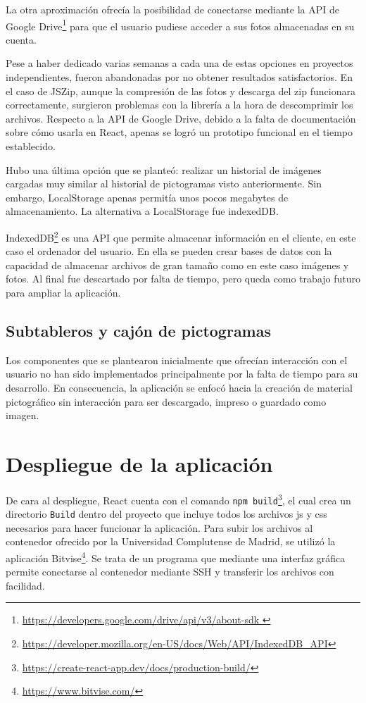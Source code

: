 La otra aproximación ofrecía la posibilidad de conectarse mediante la API de Google Drive\footnote{\url{https://developers.google.com/drive/api/v3/about-sdk }} para que el usuario pudiese acceder a sus fotos almacenadas en su cuenta. 

Pese a haber dedicado varias semanas a cada una de estas opciones en proyectos independientes, fueron abandonadas por no obtener resultados satisfactorios. En el caso de JSZip, aunque la compresión de las fotos y descarga del zip funcionara correctamente, surgieron problemas con la librería a la hora de descomprimir los archivos. Respecto a la API de Google Drive, debido a la falta de documentación sobre cómo usarla en React, apenas se logró un prototipo funcional en el tiempo establecido. 

Hubo una última opción que se planteó: realizar un historial de imágenes cargadas muy similar al historial de pictogramas visto anteriormente. Sin embargo, LocalStorage apenas permitía unos pocos megabytes de almacenamiento. La alternativa a LocalStorage fue indexedDB. 

IndexedDB\footnote{\url{https://developer.mozilla.org/en-US/docs/Web/API/IndexedDB_API}}   es una API que permite almacenar información en el cliente, en este caso el ordenador del usuario. En ella se pueden crear bases de datos con la capacidad de almacenar archivos de gran tamaño como en este caso imágenes y fotos. Al final fue descartado por falta de tiempo, pero queda como trabajo futuro para ampliar la aplicación.


\subsection{Subtableros y cajón de pictogramas}

Los componentes que se plantearon inicialmente que ofrecían interacción con el usuario no han sido implementados principalmente por la falta de tiempo para su desarrollo. En consecuencia, la aplicación se enfocó hacia la creación de material pictográfico sin interacción para ser descargado, impreso o guardado como imagen. 

\section{Despliegue de la aplicación}
\label{cap5:despliegue}

De cara al despliegue, React cuenta con el comando \texttt{npm build}\footnote{\url{https://create-react-app.dev/docs/production-build/}}, el cual crea un directorio \texttt{Build} dentro del proyecto que incluye todos los archivos js y css necesarios para hacer funcionar la aplicación. Para subir los archivos al contenedor ofrecido por la Universidad Complutense de Madrid, se utilizó la aplicación Bitvise\footnote{\url{https://www.bitvise.com/}}. Se trata de un programa que mediante una interfaz gráfica permite conectarse al contenedor mediante SSH y transferir los archivos con facilidad. 

